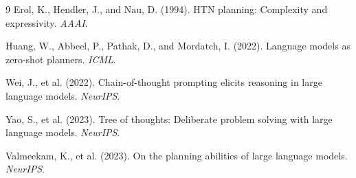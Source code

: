 \documentclass{article}
\begin{document}

\begin{thebibliography}{9}
Erol, K., Hendler, J., and Nau, D. (1994). HTN planning: Complexity and expressivity. \textit{AAAI}.

Huang, W., Abbeel, P., Pathak, D., and Mordatch, I. (2022). Language models as zero-shot planners. \textit{ICML}.

Wei, J., et al. (2022). Chain-of-thought prompting elicits reasoning in large language models. \textit{NeurIPS}.

Yao, S., et al. (2023). Tree of thoughts: Deliberate problem solving with large language models. \textit{NeurIPS}.

Valmeekam, K., et al. (2023). On the planning abilities of large language models. \textit{NeurIPS}.
\end{thebibliography}
\end{document}
